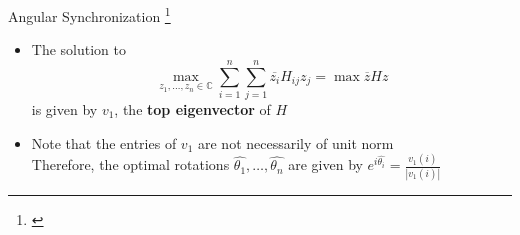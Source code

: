 \begin{frame}{Angular Synchronization \let\thefootnote\relax\footnote{\cite{singer2011angular}}}
{\begin{itemize}
%
        \item The solution to
        $$\max_{z_1, \dots, z_n \in \mathbb{C}} \sum_{i=1}^{n}\sum_{j=1}^{n} \overline{z_i} H_{ij} z_j = \max \overline{z} H z$$
        is given by $v_1$, the {\bf top eigenvector} of $H$

        \item Note that the entries of $v_1$ are not necessarily of unit norm\\
        Therefore, the optimal rotations $\hat{\theta_1}, \dots, \hat{\theta_n}$ are given by
        $e^{i \hat{\theta_i}} = \frac{v_1(i)}{|v_1(i)|}$

%
%
    \end{itemize}
    \par}
\end{frame}

